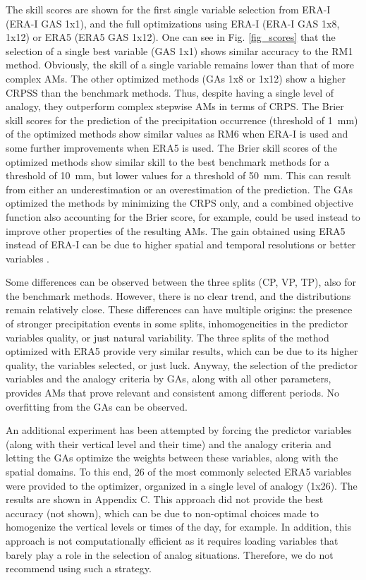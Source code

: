 \documentclass[draft]{agujournal2019}
\begin{document}
The skill scores are shown for the first single variable selection from ERA-I (ERA-I GAS 1x1), and the full optimizations using ERA-I (ERA-I GAS 1x8, 1x12) or ERA5 (ERA5 GAS 1x12). One can see in Fig. \ref{fig_scores} that the selection of a single best variable (GAS 1x1) shows similar accuracy to the RM1 method. Obviously, the skill of a single variable remains lower than that of more complex AMs. The other optimized methods (GAs 1x8 or 1x12) show a higher CRPSS than the benchmark methods. Thus, despite having a single level of analogy, they outperform complex stepwise AMs in terms of CRPS. The Brier skill scores for the prediction of the precipitation occurrence (threshold of 1~mm) of the optimized methods show similar values as RM6 when ERA-I is used and some further improvements when ERA5 is used. The Brier skill scores of the optimized methods show similar skill to the best benchmark methods for a threshold of 10~mm, but lower values for a threshold of 50~mm. This can result from either an underestimation or an overestimation of the prediction. The GAs optimized the methods by minimizing the CRPS only, and a combined objective function also accounting for the Brier score, for example, could be used instead to improve other properties of the resulting AMs. The gain obtained using ERA5 instead of ERA-I can be due to higher spatial and temporal resolutions or better variables \cite{Horton2021}. 

Some differences can be observed between the three splits (CP, VP, TP), also for the benchmark methods. However, there is no clear trend, and the distributions remain relatively close. These differences can have multiple origins: the presence of stronger precipitation events in some splits, inhomogeneities in the predictor variables quality, or just natural variability. The three splits of the method optimized with ERA5 provide very similar results, which can be due to its higher quality, the variables selected, or just luck. Anyway, the selection of the predictor variables and the analogy criteria by GAs, along with all other parameters, provides AMs that prove relevant and consistent among different periods. No overfitting from the GAs can be observed.

An additional experiment has been attempted by forcing the predictor variables (along with their vertical level and their time) and the analogy criteria and letting the GAs optimize the weights between these variables, along with the spatial domains. To this end, 26 of the most commonly selected ERA5 variables were provided to the optimizer, organized in a single level of analogy (1x26). The results are shown in Appendix C. This approach did not provide the best accuracy (not shown), which can be due to non-optimal choices made to homogenize the vertical levels or times of the day, for example. In addition, this approach is not computationally efficient as it requires loading variables that barely play a role in the selection of analog situations. Therefore, we do not recommend using such a strategy.
\end{document}
